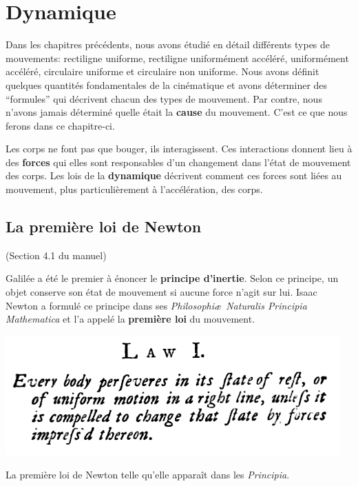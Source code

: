 \chapter{Dynamique}

Dans les chapitres précédents, nous avons étudié en détail différents types de
mouvements: rectiligne uniforme, rectiligne uniformément accéléré, uniformément
accéléré, circulaire uniforme et circulaire non uniforme.  Nous avons définit
quelques quantités fondamentales de la cinématique et avons déterminer des
``formules'' qui décrivent chacun des types de mouvement.  Par contre, nous
n'avons jamais déterminé quelle était la \textbf{cause} du mouvement.  C'est
ce que nous ferons dans ce chapitre-ci.

Les corps ne font pas que bouger, ils interagissent.  Ces interactions donnent
lieu à des \textbf{forces} qui elles sont responsables d'un changement dans
l'état de mouvement des corps.  Les lois de la \textbf{dynamique} décrivent
comment ces forces sont liées au mouvement, plus particulièrement à
l'accélération, des corps.

\section{La première loi de Newton}
\label{sec:La première loi de Newton}

(Section 4.1 du manuel)

Galilée a été le premier à énoncer le \textbf{principe d'inertie}.  Selon ce
principe, un objet conserve son état de mouvement si aucune force n'agit sur
lui.  Isaac Newton a formulé ce principe dans ses
\textit{Philosophi\ae~Naturalis Principia Mathematica} et l'a appelé la
\textbf{première loi} du mouvement.
\begin{marginfigure}
  \begin{center}
    \includegraphics[scale=0.38]{./04_Dynamique/newton1stlaw.png}
  \end{center}
  \caption{La première loi de Newton telle qu'elle apparaît dans les
    \textit{Principia}.}
  \label{fig:firstlaw}
\end{marginfigure}

